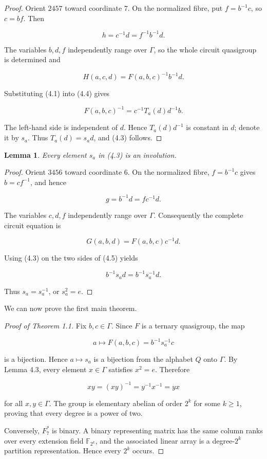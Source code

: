 \documentclass[11pt]{article}
\newtheorem{lemma}[theorem]{Lemma}
\numberwithin{equation}{section}
\begin{document}
\begin{proof}
Orient $2457$ toward coordinate $7$. On the normalized fibre,
put $f=b^{-1}c$, so $c=bf$. Then

\nopagebreak[4]
\[
h=c^{-1}d=f^{-1}b^{-1}d.
\]

The variables $b,d,f$ independently range over $\Gamma$, so the whole
circuit quasigroup is determined and

\nopagebreak[4]
\[
H(a,c,d)=F(a,b,c)^{-1}b^{-1}d.       \tag{4.4}
\]

Substituting (4.1) into (4.4) gives

\nopagebreak[4]
\[
F(a,b,c)^{-1}=c^{-1}T_a(d)d^{-1}b.
\]

The left-hand side is independent of $d$. Hence $T_a(d)d^{-1}$ is
constant in $d$; denote it by $s_a$. Thus $T_a(d)=s_ad$, and (4.3)
follows.
\end{proof}


\Needspace{0.26\textheight}
\begin{lemma}
Every element $s_a$ in (4.3) is an involution.

\end{lemma}

\begin{proof}
Orient $3456$ toward coordinate $6$. On the normalized fibre,
$f=b^{-1}c$ gives $b=cf^{-1}$, and hence

\nopagebreak[4]
\[
g=b^{-1}d=fc^{-1}d.
\]

The variables $c,d,f$ independently range over $\Gamma$. Consequently
the complete circuit equation is

\nopagebreak[4]
\[
G(a,b,d)=F(a,b,c)c^{-1}d.            \tag{4.5}
\]

Using (4.3) on the two sides of (4.5) yields

\nopagebreak[4]
\[
b^{-1}s_ad=b^{-1}s_a^{-1}d.
\]

Thus $s_a=s_a^{-1}$, or $s_a^2=e$.
\end{proof}


\Needspace{0.26\textheight}
We can now prove the first main theorem.

\begin{proof}[Proof of Theorem 1.1]
Fix $b,c\in\Gamma$. Since $F$ is a ternary
quasigroup, the map

\nopagebreak[4]
\[
a\longmapsto F(a,b,c)=b^{-1}s_a^{-1}c
\]

is a bijection. Hence $a\mapsto s_a$ is a bijection from the alphabet
$Q$ onto $\Gamma$. By Lemma 4.3, every element $x\in\Gamma$ satisfies
$x^2=e$. Therefore

\nopagebreak[4]
\[
xy=(xy)^{-1}=y^{-1}x^{-1}=yx
\]

for all $x,y\in\Gamma$. The group is elementary abelian of order $2^k$
for some $k\ge1$, proving that every degree is a power of two.

Conversely, $F_7^*$ is binary. A binary representing matrix has the same
column ranks over every extension field $\mathbb F_{2^k}$, and the associated
linear array is a degree-$2^k$ partition representation. Hence every
$2^k$ occurs.
\end{proof}
\end{document}
